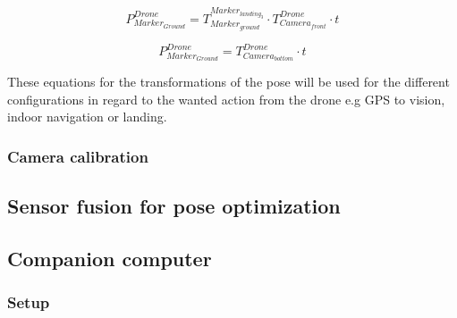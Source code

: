 \documentclass[../Head/report.tex]{subfiles}
\begin{document}
\begin{equation}
	P^{Drone}_{Marker_{Ground}} = T^{Marker_{landing_3}}_{Marker_{ground}} \cdot T^{Drone}_{Camera_{front}} \cdot t
	\label{eq:translation_drone2ground_landing3}   
\end{equation} 

\begin{equation}
	P^{Drone}_{Marker_{Ground}} = T^{Drone}_{Camera_{bottom}} \cdot t 
	\label{eq:translation_drone2ground}  
\end{equation}

These equations for the transformations of the pose will be used for the different configurations in regard to the wanted action from the drone e.g GPS to vision, indoor navigation or landing.    

\subsubsection{Camera calibration}

\subsection{Sensor fusion for pose optimization}
\label{sec:sensor_fusion_for_pose_optimization}

\subsection{Companion computer}
\label{sec:companion_computer}


\subsubsection{Setup}



\end{document}
